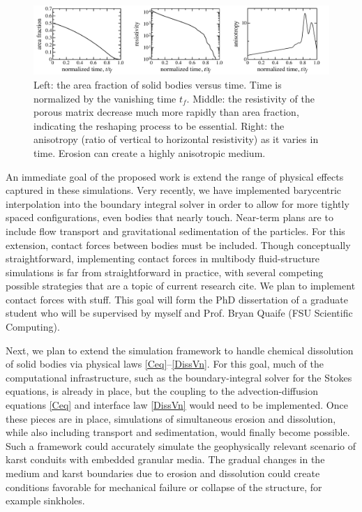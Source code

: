 \documentclass[11pt]{article}
\begin{document}
\begin{figure}%
\begin{center}
\includegraphics[width = 0.99 \textwidth]{./figs/fig3.pdf}
\caption{\label{fig3} Left: the area fraction of solid bodies versus time. Time is normalized by the vanishing time $t_f$. Middle: the resistivity of the porous matrix decrease much more rapidly than area fraction, indicating the reshaping process to be essential. Right: the anisotropy (ratio of vertical to horizontal resistivity) as it varies in time. Erosion can create a highly anisotropic medium.
}
\end{center}
\end{figure}

An immediate goal of the proposed work is extend the range of physical effects captured in these simulations. Very recently, we have implemented barycentric interpolation into the boundary integral solver in order to allow for more tightly spaced configurations, even bodies that nearly touch. Near-term plans are to include flow transport and gravitational sedimentation of the particles. For this extension, contact forces between bodies must be included. Though conceptually straightforward, implementing contact forces in multibody fluid-structure simulations is far from straightforward in practice, with several competing possible strategies that are a topic of current research  {\color{blue} cite}. We plan to implement contact forces with {\color{blue} stuff}. This goal will form the PhD dissertation of a graduate student who will be supervised by myself and Prof. Bryan Quaife (FSU Scientific Computing).

Next, we plan to extend the simulation framework to handle chemical dissolution of solid bodies via physical laws \eqref{Ceq}--\eqref{DissVn}. For this goal, much of the computational infrastructure, such as the boundary-integral solver for the Stokes equations, is already in place, but the coupling to the advection-diffusion equations \eqref{Ceq} and interface law \eqref{DissVn} would need to be implemented. Once these pieces are in place, simulations of simultaneous erosion and dissolution, while also including transport and sedimentation, would finally become possible. Such a framework could accurately simulate the geophysically relevant scenario of karst conduits with embedded granular media. The gradual changes in the medium and karst boundaries due to erosion and dissolution could create conditions favorable for mechanical failure or collapse of the structure, for example sinkholes.
\end{document}
